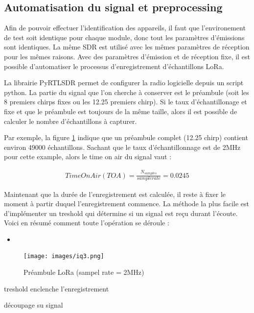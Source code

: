 \subsection{Automatisation du signal et preprocessing}

Afin de pouvoir effectuer l'identification des appareils, il faut que l'environement de test soit identique pour chaque module, donc tout les paramètres d'émissions sont identiques. La même SDR est utilisé avec les mêmes paramètres de réception pour les mêmes raisons. Avec des paramètres d'émission et de réception fixe, il est possible d'automatiser le processus d'enregistrement d'échantillons LoRa.

La librairie PyRTLSDR permet de configurer la radio logicielle depuis un script python. La partie du signal que l'on cherche à conserver est le préambule (soit les 8 premiers chirps fixes ou les 12.25 premiers chirp). Si le taux d'échantillonage et fixe et que le préambule est toujours de la même taille, alors il est possible de calculer le nombre d'échantillons à capturer. 

Par exemple, la figure \ref{term311} indique que un préambule complet (12.25 chirp) contient environ 49000 échantillons. Sachant que le taux d'échantillonnage est de 2MHz pour cette example, alors le time on air du signal vaut :

\begin{align}
    Time On Air (TOA) = \frac{N_{samples}}{sample rate} = 0.0245
\end{align}

Maintenant que la durée de l'enregistrement est calculée, il reste à fixer le moment à partir duquel l'enregistrement commence. La méthode la plus facile est d'implémenter un treshold qui détermine si un signal est reçu durant l'écoute. Voici en résumé comment toute l'opération se déroule :

\begin{itemize}
\item 
\end{itemize}



\begin{figure}[h]
\centering

\texttt{[image: images/iq3.png]}
\caption{Préambule LoRa (sampel rate = 2MHz)}\label{term311}
\end{figure}


treshold enclenche l'enregistrement

découpage su signal

